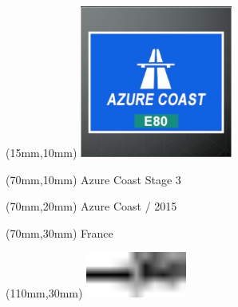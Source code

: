 \null\newpage
\begin{textblock*}{50mm}(15mm,10mm)%
\includegraphics[width=50mm]{LG/2015-05-20_00073.png}
\end{textblock*}
\begin{textblock*}{130mm}(70mm,10mm)%
{\fontsize{20}{20}\selectfont Azure Coast Stage 3}\\
\end{textblock*}
\begin{textblock*}{120mm}(70mm,20mm)%
{\fontsize{16}{16}\selectfont Azure Coast / 2015}\\
\end{textblock*}
\begin{textblock*}{120mm}(70mm,30mm)%
{\fontsize{12}{12}\selectfont France}
\end{textblock*}
\begin{textblock*}{30mm}(110mm,30mm)%
\centering
\includegraphics[height=15mm]{icons/tofinish.pdf}
\end{textblock*}

